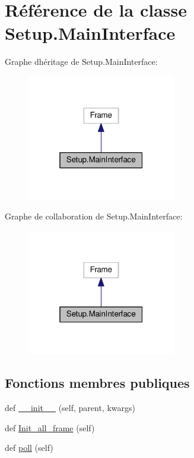 \hypertarget{classSetup_1_1MainInterface}{}\section{Référence de la classe Setup.\+Main\+Interface}
\label{classSetup_1_1MainInterface}


Graphe d\textquotesingle{}héritage de Setup.\+Main\+Interface\+:
\nopagebreak
\begin{figure}[H]
\begin{center}
\leavevmode
\includegraphics[width=184pt]{classSetup_1_1MainInterface__inherit__graph}
\end{center}
\end{figure}


Graphe de collaboration de Setup.\+Main\+Interface\+:
\nopagebreak
\begin{figure}[H]
\begin{center}
\leavevmode
\includegraphics[width=184pt]{classSetup_1_1MainInterface__coll__graph}
\end{center}
\end{figure}
\subsection*{Fonctions membres publiques}
\begin{DoxyCompactItemize}
\item 
def \hyperlink{classSetup_1_1MainInterface_af0e5e02f560904a0eccb74c753708bc7}{\+\_\+\+\_\+init\+\_\+\+\_\+} (self, parent, kwargs)
\item 
def \hyperlink{classSetup_1_1MainInterface_aee0717844e2994e5508650ab68308275}{Init\+\_\+all\+\_\+frame} (self)
\item 
def \hyperlink{classSetup_1_1MainInterface_aeed36bab3e2220dbe30b6f008f94a9b3}{poll} (self)
\end{DoxyCompactItemize}
